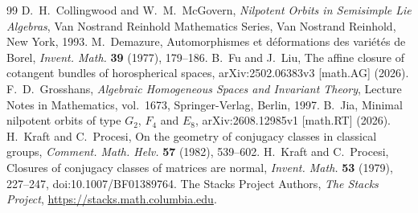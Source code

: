 \documentclass[10pt,a4paper]{amsart}
\begin{document}
\begin{thebibliography}{99}
 D.~H.~Collingwood and W.~M.~McGovern, \emph{Nilpotent Orbits in Semisimple Lie Algebras}, Van Nostrand Reinhold Mathematics Series, Van Nostrand Reinhold, New York, 1993.
 M.~Demazure, Automorphismes et d\'eformations des vari\'et\'es de Borel, \emph{Invent. Math.} \textbf{39} (1977), 179--186.
 B.~Fu and J.~Liu, The affine closure of cotangent bundles of horospherical spaces, arXiv:2502.06383v3 [math.AG] (2026).
 F.~D.~Grosshans, \emph{Algebraic Homogeneous Spaces and Invariant Theory}, Lecture Notes in Mathematics, vol.~1673, Springer-Verlag, Berlin, 1997.
 B.~Jia, Minimal nilpotent orbits of type $G_2$, $F_4$ and $E_8$, arXiv:2608.12985v1 [math.RT] (2026).
 H.~Kraft and C.~Procesi, On the geometry of conjugacy classes in classical groups, \emph{Comment. Math. Helv.} \textbf{57} (1982), 539--602.
 H.~Kraft and C.~Procesi, Closures of conjugacy classes of matrices are normal, \emph{Invent. Math.} \textbf{53} (1979), 227--247, doi:10.1007/BF01389764.
 The Stacks Project Authors, \emph{The Stacks Project}, \url{https://stacks.math.columbia.edu}.
\end{thebibliography}
\end{document}
